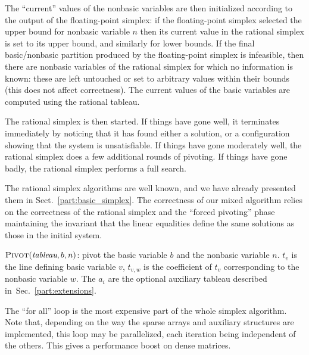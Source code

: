 The ``current'' values of the nonbasic variables are then initialized according to the output of the floating-point simplex: if the floating-point simplex selected the upper bound for nonbasic variable $n$ then its current value in the rational simplex is set to its upper bound, and similarly for lower bounds. If the final basic/nonbasic partition produced by the floating-point simplex is infeasible, then there are nonbasic variables of the rational simplex for which no information is known: these are left untouched or set to arbitrary values within their bounds (this does not affect correctness).  The current values of the basic variables are computed using the rational tableau.

The rational simplex is then started. If things have gone well, it terminates immediately by noticing that it has found either a solution, or a configuration showing that the system is unsatisfiable. If things have gone moderately well, the rational simplex does a few additional rounds of pivoting. If things have gone badly, the rational simplex performs a full search.

The rational simplex algorithms are well known, and we have already presented them in Sect.~\ref{part:basic_simplex}. The correctness of our mixed algorithm relies on the correctness of the rational simplex and 
the ``forced pivoting'' phase maintaining the invariant that the linear equalities define the same solutions as those in the initial system.

\begin{algorithm}
\caption{$\textsc{Pivot}(\textit{tableau}, b, n)$: pivot the basic variable $b$ and the nonbasic variable $n$. $t_v$ is the line defining basic variable $v$, $t_{v,w}$ is the coefficient of $t_v$ corresponding to the nonbasic variable $w$. The $a_i$ are the optional auxiliary tableau described in~Sec.~\ref{part:extensions}.}
\label{algo:Pivot}
\begin{algorithmic}
\ENDFOR
{}
\end{algorithmic}

The ``for all'' loop is the most expensive part of the whole simplex algorithm.
Note that, depending on the way the sparse arrays and auxiliary structures are implemented, this loop may be parallelized, each iteration being independent of the others. This gives a performance boost on dense matrices.
\end{algorithm}

